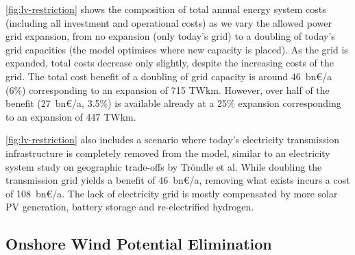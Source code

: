 \cref{fig:lv-restriction} shows the composition of total annual energy system costs
(including all investment and operational costs) as we vary the allowed power
grid expansion, from no expansion (only today's grid) to a doubling of today's
grid capacities (the model optimises where new capacity is placed). As the grid
is expanded, total costs decrease only slightly, despite the increasing costs of
the grid. The total cost benefit of a doubling of grid capacity is around
46~bn\euro/a (6\%) corresponding to an expansion of 715 TWkm. However, over half
of the benefit (27~bn\euro/a, 3.5\%) is available already at a 25\% expansion
corresponding to an expansion of 447 TWkm.

\cref{fig:lv-restriction} also includes a scenario where today's electricity
transmission infrastructure is completely removed from the model, similar to an
electricity system study on geographic trade-offs by Tröndle et
al. While doubling the transmission grid
yields a benefit of 46~bn\euro/a, removing what exists incurs a cost of
108~bn\euro/a. The lack of electricity grid is mostly compensated by more solar
PV generation, battery storage and re-electrified hydrogen.

\subsection{Onshore Wind Potential Elimination}
\label{sec:si:onw}

